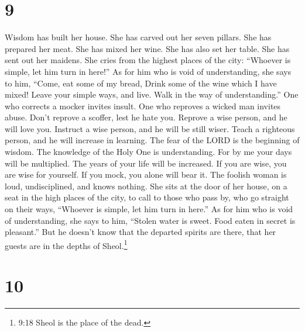 \hypertarget{section-8}{%
\section{9}\label{section-8}}

 Wisdom has built her house. She has carved out her seven
pillars.  She has prepared her meat. She has mixed her wine.
She has also set her table.  She has sent out her maidens.
She cries from the highest places of the city:  ``Whoever is
simple, let him turn in here!'' As for him who is void of understanding,
she says to him,  ``Come, eat some of my bread, Drink some
of the wine which I have mixed!  Leave your simple ways, and
live. Walk in the way of understanding.''  One who corrects
a mocker invites insult. One who reproves a wicked man invites abuse.
 Don't reprove a scoffer, lest he hate you. Reprove a wise
person, and he will love you.  Instruct a wise person, and
he will be still wiser. Teach a righteous person, and he will increase
in learning.  The fear of the LORD is the beginning of
wisdom. The knowledge of the Holy One is understanding. 
For by me your days will be multiplied. The years of your life will be
increased.  If you are wise, you are wise for yourself. If
you mock, you alone will bear it.  The foolish woman is
loud, undisciplined, and knows nothing.  She sits at the
door of her house, on a seat in the high places of the city,
 to call to those who pass by, who go straight on their
ways,  ``Whoever is simple, let him turn in here.'' As for
him who is void of understanding, she says to him, 
``Stolen water is sweet. Food eaten in secret is pleasant.''
 But he doesn't know that the departed spirits are there,
that her guests are in the depths of Sheol.\footnote{9:18 Sheol is the
  place of the dead.}

\hypertarget{section-9}{%
\section{10}\label{section-9}}

